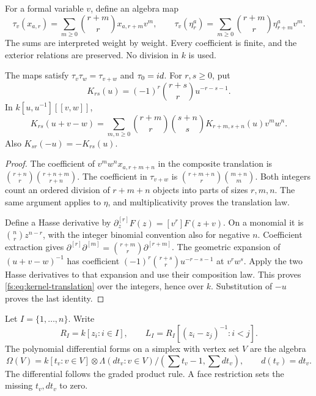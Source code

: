 For a formal variable \(v\), define an algebra map
\begin{equation}\label{fs:eq:hasse-translation}
 \tau_v(x_{a,r})=\sum_{m\ge0}\binom{r+m}{r}x_{a,r+m}v^m,
 \qquad
 \tau_v(\eta^a_r)=\sum_{m\ge0}\binom{r+m}{r}\eta^a_{r+m}v^m.
\end{equation}
The sums are interpreted weight by weight.  Every coefficient is
finite, and the exterior relations are preserved.  No division in
\(k\) is used.

\begin{lemma}\label{fs:lem:hasse}
The maps satisfy \(\tau_v\tau_w=\tau_{v+w}\) and \(\tau_0=id\).
For \(r,s\ge0\), put
\[
 K_{rs}(u)=(-1)^r\binom{r+s}{r}u^{-r-s-1}.
\]
In \(k[u,u^{-1}][[v,w]]\),
\begin{equation}\label{fs:eq:kernel-translation}
 K_{rs}(u+v-w)=
 \sum_{m,n\ge0}\binom{r+m}{r}\binom{s+n}{s}
 K_{r+m,s+n}(u)v^mw^n.
\end{equation}
Also \(K_{sr}(-u)=-K_{rs}(u)\).
\end{lemma}

\begin{proof}
The coefficient of \(v^mw^n x_{a,r+m+n}\) in the composite
translation is
\(\binom{r+n}{r}\binom{r+n+m}{r+n}\).
The coefficient in \(\tau_{v+w}\) is
\(\binom{r+m+n}{r}\binom{m+n}{m}\).
Both integers count an ordered division of \(r+m+n\) objects
into parts of sizes \(r,m,n\).  The same argument applies to
\(\eta\), and multiplicativity proves the translation law.

Define a Hasse derivative by
\(\partial_z^{[r]}F(z)=[v^r]F(z+v)\).
On a monomial it is \(\binom nr z^{n-r}\), with the integer
binomial convention also for negative \(n\).  Coefficient extraction
gives
\(\partial^{[r]}\partial^{[m]}=\binom{r+m}{r}\partial^{[r+m]}\).
The geometric expansion of \((u+v-w)^{-1}\) has coefficient
\((-1)^r\binom{r+s}{r}u^{-r-s-1}\) at \(v^rw^s\).
Apply the two Hasse derivatives to that expansion and use their
composition law.  This proves \eqref{fs:eq:kernel-translation} over
the integers, hence over \(k\).  Substitution of \(-u\) proves
the last identity.
\end{proof}

Let \(I=\{1,\ldots,n\}\).  Write
\[
 R_I=k[z_i:i\in I],\qquad
 L_I=R_I[(z_i-z_j)^{-1}:i<j].
\]
The polynomial differential forms on a simplex with vertex set \(V\)
are the algebra
\[
 \Omega(V)=
 k[t_v:v\in V]\otimes\Lambda(dt_v:v\in V)
 /(\sum t_v-1,\sum dt_v),
 \qquad d(t_v)=dt_v.
\]
The differential follows the graded product rule.  A face restriction
sets the missing \(t_v,dt_v\) to zero.

